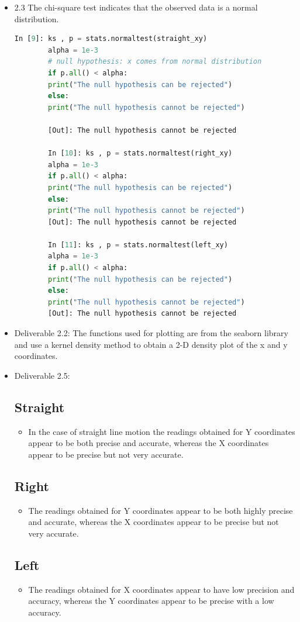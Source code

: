 \documentclass[11pt,a4paper]{article}
\begin{document}
	\begin{itemize}
		\item 2.3 The chi-square test indicates that the observed data is a normal distribution.
		\begin{lstlisting}[language=Python]
		In [9]: ks , p = stats.normaltest(straight_xy)
		alpha = 1e-3
		# null hypothesis: x comes from normal distribution
		if p.all() < alpha: 
		print("The null hypothesis can be rejected")
		else:
		print("The null hypothesis cannot be rejected")
		
		[Out]: The null hypothesis cannot be rejected
		
		In [10]: ks , p = stats.normaltest(right_xy)
		alpha = 1e-3
		if p.all() < alpha: 
		print("The null hypothesis can be rejected")
		else:
		print("The null hypothesis cannot be rejected")
		[Out]: The null hypothesis cannot be rejected
		
		In [11]: ks , p = stats.normaltest(left_xy)
		alpha = 1e-3
		if p.all() < alpha: 
		print("The null hypothesis can be rejected")
		else:
		print("The null hypothesis cannot be rejected")
		[Out]: The null hypothesis cannot be rejected
		\end{lstlisting}
		
		\item Deliverable 2.2: The functions used for plotting are from the seaborn library and use a kernel density method to obtain a 2-D density plot of the x and y coordinates. 
		\item Deliverable 2.5:
		\subsection{Straight}
		\begin{itemize}
			\item In the case of straight line motion the readings obtained for Y coordinates appear to be both precise and accurate, whereas the X coordinates appear to be precise but not very accurate.
		\end{itemize} 
		\subsection{Right}
		\begin{itemize}
			\item The readings obtained for Y coordinates appear to be both highly precise and accurate, whereas the X coordinates appear to be precise but not very accurate.
		\end{itemize}
		\subsection{Left}
		\begin{itemize}
			\item The readings obtained for X coordinates appear to have low precision and accuracy, whereas the Y coordinates appear to be precise with a low accuracy.
		\end{itemize}
	\end{itemize}
	
\end{document}
